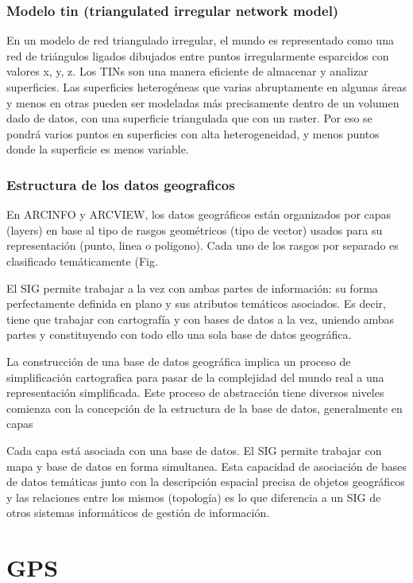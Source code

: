 \subsubsection{Modelo tin (triangulated irregular network model)}

En un modelo de red triangulado irregular, el mundo es representado como una red de triángulos ligados dibujados entre puntos irregularmente esparcidos con valores x, y, z. Los TINs son una manera eficiente de almacenar y analizar superficies. Las superficies heterogéneas que varias abruptamente en algunas áreas y menos en otras pueden ser modeladas más precisamente dentro de un volumen dado de datos, con una superficie triangulada que con un raster. Por eso se pondrá varios puntos en superficies con alta heterogeneidad, y menos puntos donde la superficie es menos variable.

\subsubsection{Estructura de los datos geograficos}

En ARCINFO y ARCVIEW, los datos geográficos están organizados por capas (layers) en base al tipo de rasgos geométricos (tipo de vector) usados para su representación (punto, linea o poligono). Cada uno de los rasgos por separado es clasificado  temáticamente (Fig.

El SIG permite trabajar a la vez con ambas partes de información: su forma perfectamente definida en plano y sus atributos temáticos asociados. Es decir, tiene que trabajar con cartografía y con bases de datos a la vez, uniendo ambas partes y constituyendo con todo ello una sola base de datos geográfica.

La construcción de una base de datos geográfica implica un proceso de simplificación cartografica  para pasar de la complejidad del mundo real a una representación simplificada. Este proceso de abstracción tiene diversos niveles comienza con la concepción de la estructura de la base de datos, generalmente en capas

Cada capa está asociada con una base de datos. El SIG permite trabajar con mapa y  base de datos en  forma simultanea. Esta capacidad de asociación de bases de datos temáticas junto con la descripción espacial precisa de objetos geográficos y las relaciones entre los mismos (topología) es lo que diferencia a un SIG de otros sistemas informáticos de gestión de información.

\section{GPS}

